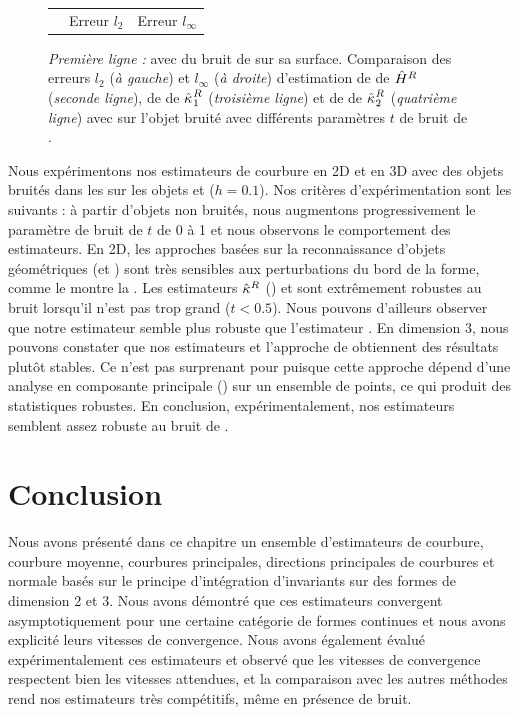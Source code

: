 \begin{figure}[ht]
\begin{center}
\begin{tabular}{@{}l c c @{}}
      &
      Erreur $l_2$ &
      Erreur $l_\infty$
    \end{tabular}
    \caption{
      \emph{Première ligne :} \RoundedCube avec du bruit de \Kanungo sur sa
      surface.
       Comparaison des erreurs $l_2$ (\emph{à gauche}) et $l_\infty$ (\emph{à
       droite}) d'estimation de  de $\hat{H}^{R}$
       (\emph{seconde ligne}), de  de
       $\hat{\kappa_{}}_{1}^{R}$ (\emph{troisième ligne}) et de  de $\hat{\kappa_{}}_{2}^{R}$ (\emph{quatrième ligne}) avec
       \JetFitting sur l'objet \RoundedCube bruité avec différents paramètres $t$
       de bruit de \Kanungo.
      }
      \label{fig:curv-experiments-rounded-noise}
  \end{center}
\end{figure}

Nous expérimentons nos estimateurs de courbure en 2D et en 3D avec des objets bruités
dans les
sur les objets \Ellipse et \RoundedCube ($h = 0.1$). Nos critères
d'expérimentation sont les suivants : à partir d'objets non bruités, nous
augmentons progressivement le paramètre de bruit de \Kanungo $t$ de 0 à 1 et
nous observons le comportement des estimateurs. En 2D, les approches basées sur
la reconnaissance d'objets géométriques (\MDSS et \MDCA) sont très sensibles aux
perturbations du bord de la forme, comme le montre la
. Les estimateurs $\hat{\kappa}^{R}$
(\II) et \BC sont extrêmement robustes au bruit lorsqu'il n'est pas trop grand
($t < 0.5$). Nous pouvons d'ailleurs observer que notre estimateur semble plus
robuste que l'estimateur \BC. En dimension 3, nous pouvons constater que nos
estimateurs et l'approche de \JetFitting obtiennent des résultats plutôt
stables. Ce n'est pas surprenant pour \JetFitting puisque cette approche dépend
d'une analyse en composante principale (\ACP) sur un ensemble de points, ce qui
produit des statistiques robustes. En conclusion, expérimentalement, nos
estimateurs semblent assez robuste au bruit de \Kanungo.

%
\section{Conclusion}
\label{sec:estimators:conclusion}
%
Nous avons présenté dans ce chapitre un ensemble d'estimateurs de courbure,
courbure moyenne, courbures principales, directions principales de courbures et
normale basés sur le principe d'intégration d'invariants sur des formes de
dimension 2 et 3. Nous avons démontré que ces estimateurs convergent
asymptotiquement pour une certaine catégorie de formes continues et nous avons
explicité leurs vitesses de convergence. Nous avons également évalué
expérimentalement ces estimateurs et observé que les vitesses de convergence
respectent bien les vitesses attendues, et la comparaison avec les autres
méthodes rend nos estimateurs très compétitifs, même en présence de bruit.


